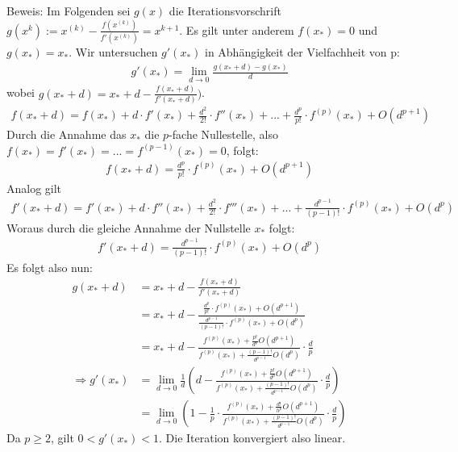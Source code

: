 Beweis: Im Folgenden sei $g(x)$ die Iterationsvorschrift $g(x^k):= x^{(k)} - \frac{f(x^{(k)})}{f'(x^{(k)})} = x^{k+1}$. Es gilt unter anderem $f(x_*) = 0$ und $g(x_*) = x_*$. Wir untersuchen
$g'(x_*)$ in Abhängigkeit der Vielfachheit von p:
\begin{align*}
g'(x_*) = \lim\limits_{d \rightarrow 0} \frac{g(x_* +d) - g(x_*)}{d}
\end{align*}
wobei $g(x_*+d) = x_*+d-\frac{f(x_*+d)}{f'(x_*+d)})$.
\begin{align*}
f(x_*+d) = f(x_*) + d \cdot f'(x_*) +\frac{d^2}{2!}\cdot f''(x_*) + ... + \frac{d^p}{p!}\cdot f^{(p)}(x_*) + O(d^{p+1})
\end{align*}
Durch die Annahme das $x_*$ die $p$-fache Nullestelle, also $f(x_*) = f'(x_*) = ... = f^{(p-1)}(x_*) = 0$, folgt:
\begin{align*}
f(x_*+d) = \frac{d^p}{p!}\cdot f^{(p)}(x_*) + O(d^{p+1})
\end{align*}
Analog gilt
\begin{align*}
f'(x_*+d) = f'(x_*) + d \cdot f''(x_*) +\frac{d^2}{2!}\cdot f'''(x_*) + ... + \frac{d^{p-1}}{(p-1)!}\cdot f^{(p)}(x_*) + O(d^{p})
\end{align*}
Woraus durch die gleiche Annahme der Nullstelle $x_*$ folgt:
\begin{align*}
f'(x_*+d) = \frac{d^{p-1}}{(p-1)!}\cdot f^{(p)}(x_*) + O(d^{p})
\end{align*}
Es folgt also nun:
\begin{align*}
g(x_*+d) &= x_*+d-\frac{f(x_*+d)}{f'(x_*+d)}\\
&= x_*+d-\frac{\frac{d^p}{p!}\cdot f^{(p)}(x_*) + O(d^{p+1})}{\frac{d^{p-1}}{(p-1)!}\cdot f^{(p)}(x_*) + O(d^{p})}\\
&= x_*+d-\frac{f^{(p)}(x_*) + \frac{p!}{d^p} O(d^{p+1})}{f^{(p)}(x_*) + \frac{(p-1)!}{d^{p-1}}O(d^{p})} \cdot \frac{d}{p}\\
\Rightarrow g'(x_*) &= \lim\limits_{d \rightarrow 0} \frac{1}{d}\left(d-\frac{f^{(p)}(x_*) + \frac{p!}{d^p} O(d^{p+1})}{f^{(p)}(x_*) + \frac{(p-1)!}{d^{p-1}}O(d^{p})} \cdot \frac{d}{p} \right)\\
&= \lim\limits_{d \rightarrow 0}\left(1- \frac{1}{p} \cdot \frac{f^{(p)}(x_*) + \frac{d!}{h^p} O(d^{p+1})}{f^{(p)}(x_*) + \frac{(p-1)!}{d^{p-1}}O(d^{p})} \cdot \frac{d}{p} \right)
\end{align*}
Da $p\ge2$, gilt $0<g'(x_*) < 1$. Die Iteration konvergiert also linear.

